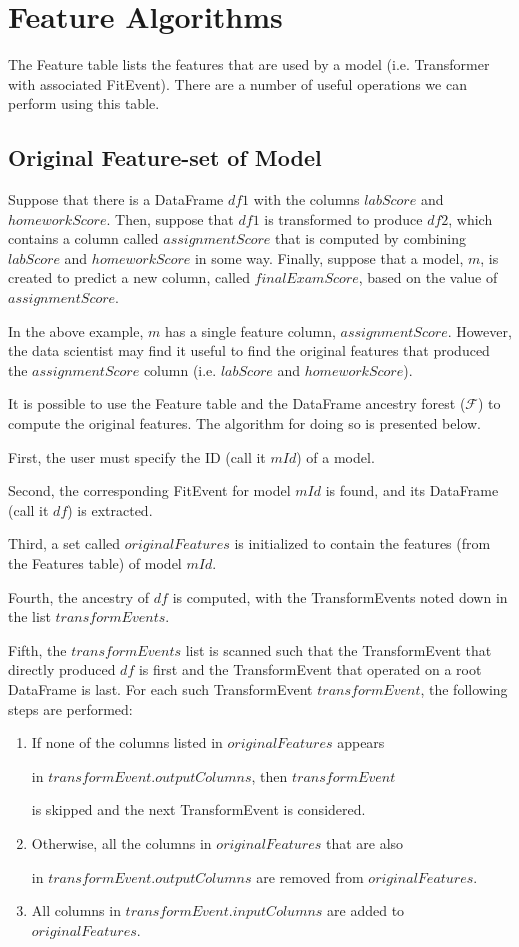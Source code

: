 \section{Feature Algorithms}
The Feature table lists the features that are used by a model (i.e. Transformer with associated FitEvent).
There are a number of useful operations we can perform using this table.

\subsection{Original Feature-set of Model}
Suppose that there is a DataFrame $df1$ with the columns $labScore$ and $homeworkScore$. Then,
suppose that $df1$ is transformed to produce $df2$, which contains a column called $assignmentScore$ that is
computed by combining $labScore$ and $homeworkScore$ in some way. Finally, suppose that a model, $m$, is created to
predict a new column, called $finalExamScore$, based on the value of $assignmentScore$.

In the above example, $m$ has a single feature column, $assignmentScore$. However, the data scientist may find
it useful to find the original features that produced the $assignmentScore$ column (i.e. $labScore$ and $homeworkScore$).

It is possible to use the Feature table and the DataFrame ancestry forest ($\mathcal{F}$) to compute the original
features. The algorithm for doing so is presented below.

First, the user must specify the ID (call it $mId$) of a model.

Second, the corresponding FitEvent for model $mId$ is found, and its DataFrame (call it $df$) is extracted.

Third, a set called $originalFeatures$ is initialized to contain the features (from the Features table) of model $mId$.

Fourth, the ancestry of $df$ is computed, with the TransformEvents noted down in the list $transformEvents$.

Fifth, the $transformEvents$ list is scanned such that the TransformEvent that directly produced $df$ is first and the
TransformEvent that operated on a root DataFrame is last. For each such TransformEvent $transformEvent$, the following steps are
performed:
\begin{enumerate}
  \item If none of the columns listed in $originalFeatures$ appears 

    in $transformEvent.outputColumns$, then $transformEvent$ 

    is skipped and the next TransformEvent is considered.
  \item Otherwise, all the columns in $originalFeatures$ that are also 

    in $transformEvent.outputColumns$ are removed from $originalFeatures$.
  \item All columns in $transformEvent.inputColumns$ are added to $originalFeatures$.
\end{enumerate}

